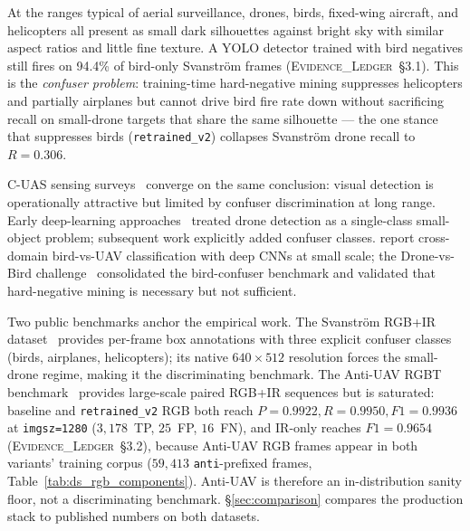 At the ranges typical of aerial surveillance, drones, birds, fixed-wing aircraft, and helicopters all present as small dark silhouettes against bright sky with similar aspect ratios and little fine texture. A YOLO detector trained with bird negatives still fires on 94.4\% of bird-only Svanstr\"om frames (\textsc{Evidence\_Ledger}~\S3.1). This is the \emph{confuser problem}: training-time hard-negative mining suppresses helicopters and partially airplanes but cannot drive bird fire rate down without sacrificing recall on small-drone targets that share the same silhouette --- the one stance that suppresses birds (\texttt{retrained\_v2}) collapses Svanstr\"om drone recall to $R=0.306$.

C-UAS sensing surveys~\cite{shi2018counteruas,taha2019drone,samaras2019deep} converge on the same conclusion: visual detection is operationally attractive but limited by confuser discrimination at long range. Early deep-learning approaches~\cite{aker2017using,rozantsev2017detecting} treated drone detection as a single-class small-object problem; subsequent work explicitly added confuser classes. \citet{schumann2017deep} report cross-domain bird-vs-UAV classification with deep CNNs at small scale; the Drone-vs-Bird challenge~\cite{coluccia2021dronevsbird} consolidated the bird-confuser benchmark and validated that hard-negative mining is necessary but not sufficient.

Two public benchmarks anchor the empirical work. The Svanstr\"om RGB+IR dataset~\cite{svanstrom2021real,svanstrom2022dronedataset} provides per-frame box annotations with three explicit confuser classes (birds, airplanes, helicopters); its native $640\times512$ resolution forces the small-drone regime, making it the discriminating benchmark. The Anti-UAV RGBT benchmark~\cite{jiang2021antiuav,zhao2023antiuav} provides large-scale paired RGB+IR sequences but is saturated: baseline and \texttt{retrained\_v2} RGB both reach $P=0.9922, R=0.9950, F1=0.9936$ at \texttt{imgsz=1280} ($3{,}178$~TP, $25$~FP, $16$~FN), and IR-only reaches $F1=0.9654$ (\textsc{Evidence\_Ledger}~\S3.2), because Anti-UAV RGB frames appear in both variants' training corpus ($59{,}413$ \texttt{anti}-prefixed frames, Table~\ref{tab:ds_rgb_components}). Anti-UAV is therefore an in-distribution sanity floor, not a discriminating benchmark. \S\ref{sec:comparison} compares the production stack to published numbers on both datasets.

